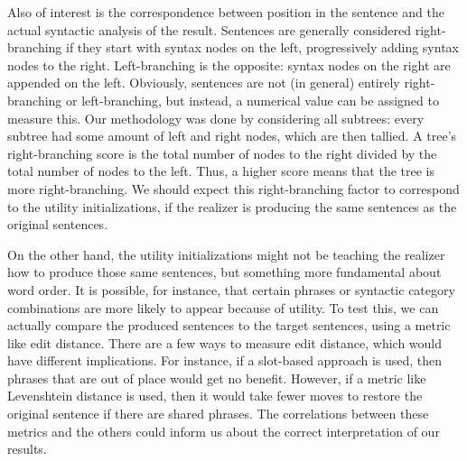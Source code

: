 Also of interest is the correspondence between position in the sentence and the actual syntactic analysis of the result. Sentences are generally considered right-branching if they start with syntax nodes on the left, progressively adding syntax nodes to the right. Left-branching is the opposite: syntax nodes on the right are appended on the left. Obviously, sentences are not (in general) entirely right-branching or left-branching, but instead, a numerical value can be assigned to measure this. Our methodology was done by considering all subtrees: every subtree had some amount of left and right nodes, which are then tallied. A tree's right-branching score is the total number of nodes to the right divided by the total number of nodes to the left. Thus, a higher score means that the tree is more right-branching. We should expect this right-branching factor to correspond to the utility initializations, if the realizer is producing the same sentences as the original sentences. 

On the other hand, the utility initializations might not be teaching the realizer how to produce those same sentences, but something more fundamental about word order. It is possible, for instance, that certain phrases or syntactic category combinations are more likely to appear because of utility. To test this, we can actually compare the produced sentences to the target sentences, using a metric like edit distance. There are a few ways to measure edit distance, which would have different implications. For instance, if a slot-based approach is used, then phrases that are out of place would get no benefit. However, if a metric like Levenshtein distance is used, then it would take fewer moves to restore the original sentence if there are shared phrases. The correlations between these metrics and the others could inform us about the correct interpretation of our results.